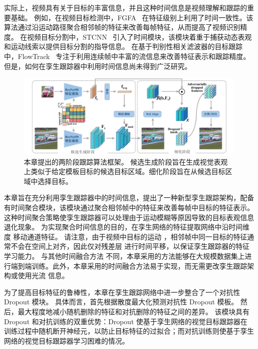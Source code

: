 实际上，视频具有关于目标的丰富信息，并且这种时间信息是视频理解和跟踪的重要基础。
例如，在视频目标检测中，FGFA~\cite{zhu2017flow} 在特征级别上利用了时间一致性。该算法通过沿运动路径聚合相邻帧的特征来改善每帧特征，从而提高了视频识别精度。
在视频目标分割中，STCNN~\cite{xu2019spatiotemporal} 引入了时间模块，该模块着重于捕获动态表观和运动线索以提供目标分割的指导信息。
在基于判别性相关滤波器的目标跟踪中，FlowTrack~\cite{FlowTrack} 专注于利用连续帧中丰富的流信息来改善特征表示和跟踪精度。
但是，如何在孪生跟踪器中利用时间信息尚未得到广泛研究。

\begin{figure}[t]
    \centering
    \includegraphics[width=1.0\textwidth]{Img/end/net_v3.pdf}
    \caption{
    本章提出的两阶段跟踪算法框架。
    候选生成阶段旨在生成视觉表观上类似于给定模板目标的候选目标区域。细化阶段旨在从候选目标区域中选择目标。}
    \label{fig:SiamTFA}
\end{figure}

本章旨在充分利用孪生跟踪器中的时间信息，提出了一种新型孪生跟踪架构，配备有时间聚合模块，该模块通过聚合相邻帧中的特征来改善每帧中目标的特征表示。
这种时间聚合策略使孪生跟踪器可以处理由于运动模糊等原因导致的目标表观信息退化现象。
为实现聚合时间信息的目的，在孪生网络的特征提取网络中沿时间维度 \cite{lin2019tsm} 移动通道特征。
请注意，由于视频中目标的运动 \cite{zhu2017flow}，相邻帧中同一目标的特征通常不会在空间上对齐，因此仅对残差层 \cite{lin2019tsm} 进行时间平移，以保证孪生跟踪器的特征学习能力。
与其他时间融合方法 \cite{tao2016siamese, gladh2016deep} 不同，本章采用的方法能够在大规模数据集上进行端到端训练。此外，本章采用的时间融合方法易于实现，而无需更改孪生跟踪架构或使用光流 \cite{FlowTrack} 信息。

为了提高目标特征的鲁棒性，本章在孪生跟踪网络中进一步整合了一个对抗性 Dropout \cite{park2018adversarial} 模块。
具体而言，首先根据散度最大化预测对抗性 Dropout 模板。
然后，最大程度地减小随机删除的特征和对抗删除的特征之间的差异。
该模块具有 Dropout 和对抗训练的双重优势：Dropout 使基于孪生网络的视觉目标跟踪器在训练过程中随机断开神经元，以防止目标特征的过拟合；而对抗训练则使基于孪生网络的视觉目标跟踪器学习困难的情况。

